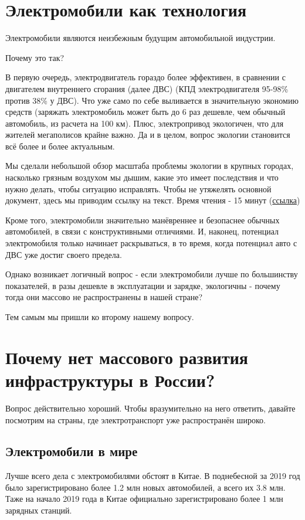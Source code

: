 \documentclass[a4paper,12pt]{report}
\begin{document}
\chapter{Электромобили как технология}
\label{chapter3}
Электромобили являются неизбежным будущим автомобильной индустрии. 

Почему это так? 

В первую очередь, электродвигатель гораздо более эффективен, в сравнении с двигателем внутреннего сгорания (далее ДВС) (КПД электродвигателя 95-98\% против 38\% у ДВС). Что уже само по себе выливается в значительную экономию средств (заряжать электромобиль может быть до 6 раз дешевле, чем обычный автомобиль, из расчета на 100 км). Плюс, электропривод экологичен, что для жителей мегаполисов крайне важно. Да и в целом, вопрос экологии становится всё более и более актуальным. 

Мы сделали небольшой обзор масштаба проблемы экологии в крупных городах, насколько грязным воздухом мы дышим, какие это имеет последствия и что нужно делать, чтобы ситуацию исправлять. Чтобы не утяжелять основной документ, здесь мы приводим ссылку на текст. Время чтения - 15 минут (\href{https://docs.google.com/document/d/1Xvn2jIdGmjOemTvSG5J-kHtrBBC3f-odBOGnE6IfGFw}{ссылка})

Кроме того, электромобили значительно манёвреннее и безопаснее обычных автомобилей, в связи с конструктивными отличиями. И, наконец, потенциал электромобиля только начинает раскрываться, в то время, когда потенциал авто с ДВС уже достиг своего предела. 

Однако возникает логичный вопрос - если электромобили лучше по большинству показателей, в разы дешевле в эксплуатации и зарядке, экологичны - почему тогда они массово не распространены в нашей стране? 

Тем самым мы пришли ко второму нашему вопросу.



\chapter{Почему нет массового развития инфраструктуры в России?}
Вопрос действительно хороший. Чтобы вразумительно на него ответить, давайте посмотрим на страны, где электротранспорт уже распространён широко. 

\section{Электромобили в мире}
Лучше всего дела с электромобилями обстоят в Китае. В поднебесной за 2019 год было зарегистрировано более 1.2 млн новых автомобилей, а всего их 3.8 млн. Таже на начало 2019 года в Китае официально зарегистрировано более 1 млн зарядных станций.
\end{document}
